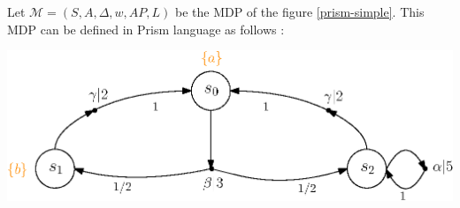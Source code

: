 \begin{example}
Let $\mathcal{M}=(S, A, \Delta, w, AP, L)$ be the MDP of the figure \ref{prism-simple}. This MDP can be defined in Prism language as follows :\\
\begin{minipage}{0.4\linewidth}
  
\end{minipage}
\begin{minipage}{0.6\linewidth}
    \includegraphics[width=\linewidth]{resources/simple-mdp}
    \captionsetup{justification=centering}
    \label{prism-simple}
\end{minipage}
\end{example}
